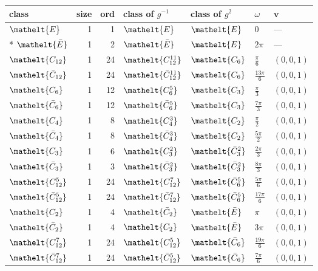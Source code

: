 \documentclass[10pt,a4paper]{article}
\numberwithin{equation}{section}
\newcommand{\eltfont}[1]{{\let\sigma\eltsigma\mathelt{#1}}}
\newcommand{\cls}[1]{\eltfont{#1}}
\newcommand{\dirvec}[3]{(#1, #2, #3)}
\newcommand{\vv}{\mathbf{v}}
\newcommand{\barred}[1]{\bar{#1}}
\begin{document}
{\renewcommand{\arraystretch}{1.3}\begin{longtable}{@{}lrrllll@{}}\toprule
class & size & ord & class of $g^{-1}$ & class of $g^{2}$ & $\omega$ & $\vv$\\\midrule\endhead
\bottomrule\endfoot\endlastfoot
$\cls{E}$ & 1 & 1 & $\cls{E}$ & $\cls{E}$ & $0$ & ---\\*
$\cls{\barred{E}}$ & 1 & 2 & $\cls{\barred{E}}$ & $\cls{E}$ & $2\pi$ & ---\\
$\cls{C_{12}}$ & 1 & 24 & $\cls{C_{12}^{11}}$ & $\cls{C_{6}}$ & $\tfrac{\pi}{6}$ & $\dirvec{0}{0}{1}$\\
$\cls{\barred{C}_{12}}$ & 1 & 24 & $\cls{\barred{C}_{12}^{11}}$ & $\cls{C_{6}}$ & $\tfrac{13\pi}{6}$ & $\dirvec{0}{0}{1}$\\
$\cls{C_{6}}$ & 1 & 12 & $\cls{C_{6}^{5}}$ & $\cls{C_{3}}$ & $\tfrac{\pi}{3}$ & $\dirvec{0}{0}{1}$\\
$\cls{\barred{C}_{6}}$ & 1 & 12 & $\cls{\barred{C}_{6}^{5}}$ & $\cls{C_{3}}$ & $\tfrac{7\pi}{3}$ & $\dirvec{0}{0}{1}$\\
$\cls{C_{4}}$ & 1 & 8 & $\cls{C_{4}^{3}}$ & $\cls{C_{2}}$ & $\tfrac{\pi}{2}$ & $\dirvec{0}{0}{1}$\\
$\cls{\barred{C}_{4}}$ & 1 & 8 & $\cls{\barred{C}_{4}^{3}}$ & $\cls{C_{2}}$ & $\tfrac{5\pi}{2}$ & $\dirvec{0}{0}{1}$\\
$\cls{C_{3}}$ & 1 & 6 & $\cls{C_{3}^{2}}$ & $\cls{\barred{C}_{3}^{2}}$ & $\tfrac{2\pi}{3}$ & $\dirvec{0}{0}{1}$\\
$\cls{\barred{C}_{3}}$ & 1 & 3 & $\cls{\barred{C}_{3}^{2}}$ & $\cls{\barred{C}_{3}^{2}}$ & $\tfrac{8\pi}{3}$ & $\dirvec{0}{0}{1}$\\
$\cls{C_{12}^{5}}$ & 1 & 24 & $\cls{C_{12}^{7}}$ & $\cls{\barred{C}_{6}^{5}}$ & $\tfrac{5\pi}{6}$ & $\dirvec{0}{0}{1}$\\
$\cls{\barred{C}_{12}^{5}}$ & 1 & 24 & $\cls{\barred{C}_{12}^{7}}$ & $\cls{\barred{C}_{6}^{5}}$ & $\tfrac{17\pi}{6}$ & $\dirvec{0}{0}{1}$\\
$\cls{C_{2}}$ & 1 & 4 & $\cls{\barred{C}_{2}}$ & $\cls{\barred{E}}$ & $\pi$ & $\dirvec{0}{0}{1}$\\
$\cls{\barred{C}_{2}}$ & 1 & 4 & $\cls{C_{2}}$ & $\cls{\barred{E}}$ & $3\pi$ & $\dirvec{0}{0}{1}$\\
$\cls{C_{12}^{7}}$ & 1 & 24 & $\cls{C_{12}^{5}}$ & $\cls{\barred{C}_{6}}$ & $\tfrac{19\pi}{6}$ & $\dirvec{0}{0}{1}$\\
$\cls{\barred{C}_{12}^{7}}$ & 1 & 24 & $\cls{\barred{C}_{12}^{5}}$ & $\cls{\barred{C}_{6}}$ & $\tfrac{7\pi}{6}$ & $\dirvec{0}{0}{1}$\\

\end{longtable}}
\end{document}
